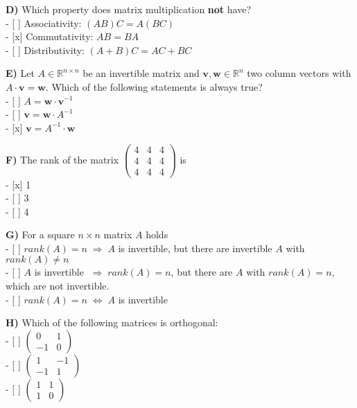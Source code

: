 \documentclass[11pt]{article}
\begin{document}
    \textbf{D)} Which property does matrix multiplication \textbf{not}
have?\\
- {[} {]} Associativity: \((AB)C = A(BC)\)\\
- {[}x{]} Commutativity: \(AB = BA\)\\
- {[} {]} Distributivity: \((A+B)C = AC + BC\)

    \textbf{E)} Let \(A \in \mathbb{R}^{n \times n}\) be an invertible
matrix and \(\mathbf{v},\mathbf{w} \in \mathbb{R}^n\) two column vectors
with \(A \cdot \mathbf{v} = \mathbf{w}\). Which of the following
statements is always true?\\
- {[} {]} \(A = \mathbf{w} \cdot \mathbf{v}^{-1}\)\\
- {[} {]} \(\mathbf{v} = \mathbf{w} \cdot A^{-1}\)\\
- {[}x{]} \(\mathbf{v} = A^{-1} \cdot \mathbf{w}\)

    \textbf{F)} The rank of the matrix
\(\left( \begin{array}{rrr} 4 & 4 & 4 \\ 4 & 4 & 4 \\ 4 & 4 & 4 \end{array} \right)\)
is\\
- {[}x{]} 1\\
- {[} {]} 3\\
- {[} {]} 4

    \textbf{G)} For a square \(n \times n\) matrix \(A\) holds\\
- {[} {]} \(rank(A) = n \; \Rightarrow \; A\) is invertible, but there
are invertible \(A\) with \(rank(A) \neq n\)\\
- {[} {]} \(A\) is invertible \(\; \Rightarrow \; rank(A) = n\), but
there are \(A\) with \(rank(A) = n\), which are not invertible.\\
- {[} {]} \(rank(A) = n \; \iff \; A\) is invertible

    \textbf{H)} Which of the following matrices is orthogonal:\\
- {[} {]}
\(\left( \begin{array}{rr} 0 & 1 \\ -1 & 0 \end{array} \right)\)\\
- {[} {]}
\(\left( \begin{array}{rr} 1 & -1 \\ -1 & 1 \end{array} \right)\)\\
- {[} {]}
\(\left( \begin{array}{rr} 1 & 1 \\ 1 & 0 \end{array} \right)\)
\end{document}
